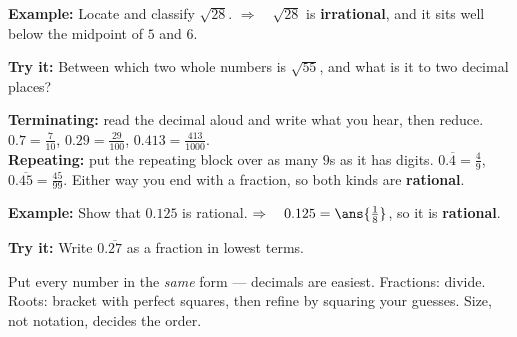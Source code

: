 \documentclass[12pt]{article}
\begin{document}
\begin{examplebox}
\textbf{Example:} Locate and classify $\sqrt{28}$.
$\Rightarrow\quad \sqrt{28}$ is \textbf{irrational}, and it sits well below the
midpoint of $5$ and $6$.
\end{examplebox}

\begin{tryitbox}
\textbf{Try it:} Between which two whole numbers is $\sqrt{55}$, and what is it
to two decimal places?\\[2pt]
\end{tryitbox}


\begin{formulabox}
\textbf{Terminating:} read the decimal aloud and write what you hear, then
reduce. $0.7 = \frac{7}{10}$, \; $0.29 = \frac{29}{100}$, \;
$0.413 = \frac{413}{1000}$.\\[2pt]
\textbf{Repeating:} put the repeating block over as many $9$s as it has digits.
$0.\overline{4} = \frac{4}{9}$, \; $0.\overline{45} = \frac{45}{99}$. Either
way you end with a fraction, so both kinds are \textbf{rational}.
\end{formulabox}

\begin{examplebox}
\textbf{Example:} Show that $0.125$ is rational.
$\Rightarrow\quad 0.125 = \ans{\tfrac{1}{8}}$, so it is \textbf{rational}.
\end{examplebox}

\begin{tryitbox}
\textbf{Try it:} Write $0.\overline{27}$ as a fraction in lowest terms.\\[2pt]
\end{tryitbox}


\begin{formulabox}
Put every number in the \emph{same} form --- decimals are easiest. Fractions:
divide. Roots: bracket with perfect squares, then refine by squaring your
guesses. Size, not notation, decides the order.
\end{formulabox}
\end{document}

